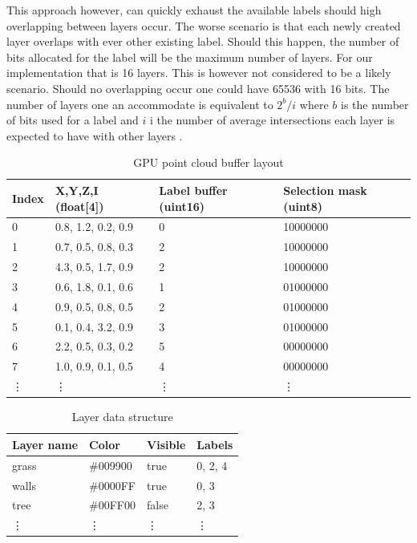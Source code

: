 This approach however, can quickly exhaust the available labels should high overlapping between layers occur. The worse scenario is that each newly created layer overlaps with ever other existing label. Should this happen, the number of bits allocated for the label will be the maximum number of layers. For our implementation that is 16 layers. This is however not considered to be a likely scenario. Should no overlapping occur one could have 65536 with 16 bits. The number of layers one an accommodate is equivalent to $2^b/i$ where $b$ is the number of bits used for a label and $i$ i the number of average intersections each layer is expected to have with other layers .



\begin{table}[h]
	\begin{center}
	\begin{tabular}{|l|l|l|l|}
	\hline
	Index & X,Y,Z,I (float{[}4{]}) & Label buffer (uint16) & Selection mask (uint8)\\
	\hline
	0     & 0.8, 1.2, 0.2, 0.9 & 0                     & 10000000               \\
	1     & 0.7, 0.5, 0.8, 0.3 & 2                     & 10000000               \\
	2     & 4.3, 0.5, 1.7, 0.9 & 2                     & 10000000               \\
	3     & 0.6, 1.8, 0.1, 0.6 & 1                     & 01000000               \\
	4     & 0.9, 0.5, 0.8, 0.5 & 2                     & 01000000               \\
	5     & 0.1, 0.4, 3.2, 0.9 & 3                     & 01000000               \\
	6     & 2.2, 0.5, 0.3, 0.2 & 5                     & 00000000               \\
	7     & 1.0, 0.9, 0.1, 0.5 & 4                     & 00000000               \\
	\vdots     & \vdots & \vdots  & \vdots             \\
	\hline
	\end{tabular}
	\end{center}
	\caption{GPU point cloud buffer layout}
\end{table}


\begin{table}[h]
	\begin{center}
	\begin{tabular}{|l|l|l|l|}
	\hline
	Layer  name & Color    & Visible & Labels \\
	\hline
	grass       & \#009900 & true & 0, 2, 4      \\
	walls       & \#0000FF & true & 0, 3  \\
	tree        & \#00FF00 & false & 2, 3   \\
	\vdots     & \vdots & \vdots   & \vdots          \\
	\hline
	\end{tabular}
	\end{center}
	\caption{Layer data structure}
\end{table}


